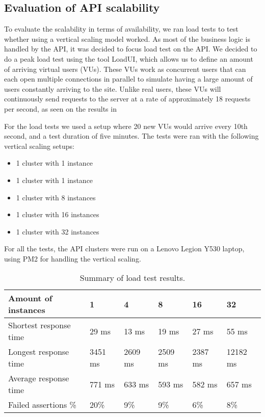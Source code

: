 \subsection{Evaluation of API scalability}
To evaluate the scalability in terms of availability, we ran load tests to test whether using a vertical scaling model worked.
As most of the business logic is handled by the API, it was decided to focus load test on the API.
We decided to do a peak load test using the tool LoadUI, which allows us to define an amount of arriving virtual users (VUs). %
These VUs work as concurrent users that can each open multiple connections in parallel to simulate having a large amount of users constantly arriving to the site.
Unlike real users, these VUs will continuously send requests to the server at a rate of approximately 18 requests per second, as seen on the results in %

For the load tests we used a setup where 20 new VUs would arrive every 10th second, and a test duration of five minutes.
The tests were ran with the following vertical scaling setups:
\begin{itemize}
    \item 1 cluster with 1 instance
    \item 1 cluster with 1 instance
    \item 1 cluster with 8 instances
    \item 1 cluster with 16 instances
    \item 1 cluster with 32 instances
\end{itemize}
For all the tests, the API clusters were run on a Lenovo Legion Y530 laptop, using PM2 for handling the vertical scaling.

\begin{table}[]
    \begin{tabular}{|l|l|l|l|l|l|}
    \hline
    \textbf{Amount of instances} & \textbf{1} & \textbf{4} & \textbf{8} & \textbf{16} & \textbf{32} \\ \hline
    Shortest response time       & 29 ms      & 13 ms      & 19 ms      & 27 ms       & 55 ms       \\ \hline
    Longest response time        & 3451 ms    & 2609 ms    & 2509 ms    & 2387 ms     & 12182 ms    \\ \hline
    Average response time        & 771 ms     & 633 ms     & 593 ms     & 582 ms      & 657 ms      \\ \hline
    Failed assertions \%         & 20\%       & 9\%        & 9\%        & 6\%         & 8\%         \\ \hline
    \end{tabular}
    \caption{Summary of load test results.}
    \label{table:load-test-table}
\end{table}

